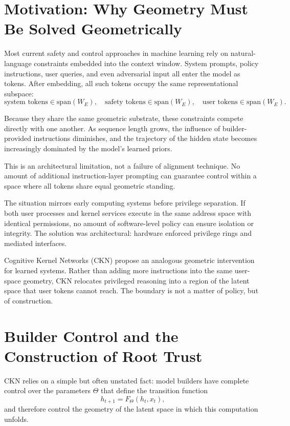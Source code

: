 \documentclass[11pt,a4paper]{article}
\begin{document}
\section{Motivation: Why Geometry Must Be Solved Geometrically}

Most current safety and control approaches in machine learning rely on natural-language constraints embedded into the context window. System prompts, policy instructions, user queries, and even adversarial input all enter the model as tokens. After embedding, all such tokens occupy the same representational subspace:
\[
\text{system tokens} \in \text{span}(W_E), \quad \text{safety tokens} \in \text{span}(W_E), \quad \text{user tokens} \in \text{span}(W_E).
\]

Because they share the same geometric substrate, these constraints compete directly with one another. As sequence length grows, the influence of builder-provided instructions diminishes, and the trajectory of the hidden state becomes increasingly dominated by the model's learned priors.

This is an architectural limitation, not a failure of alignment technique. No amount of additional instruction-layer prompting can guarantee control within a space where all tokens share equal geometric standing.

The situation mirrors early computing systems before privilege separation. If both user processes and kernel services execute in the same address space with identical permissions, no amount of software-level policy can ensure isolation or integrity. The solution was architectural: hardware enforced privilege rings and mediated interfaces.

Cognitive Kernel Networks (CKN) propose an analogous geometric intervention for learned systems. Rather than adding more instructions into the same user-space geometry, CKN relocates privileged reasoning into a region of the latent space that user tokens cannot reach. The boundary is not a matter of policy, but of construction.

\section{Builder Control and the Construction of Root Trust}

CKN relies on a simple but often unstated fact: model builders have complete control over the parameters $\Theta$ that define the transition function
\[
h_{t+1} = F_\Theta(h_t, x_t),
\]
and therefore control the geometry of the latent space in which this computation unfolds.
\end{document}
